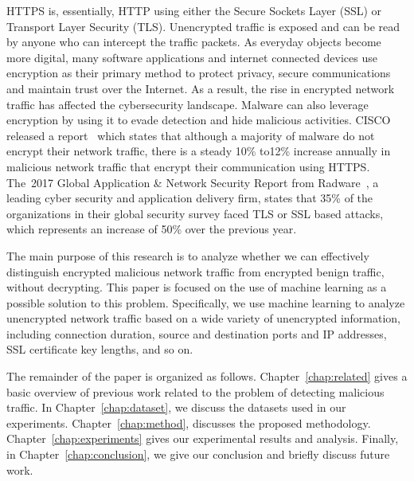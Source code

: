 HTTPS is, essentially, HTTP using either the Secure Sockets Layer (SSL) or Transport Layer Security (TLS). Unencrypted traffic is exposed and can be read by anyone who can intercept the traffic packets. As everyday objects become more digital, many software applications and internet connected devices use encryption as their primary method to protect privacy, secure communications and maintain trust over the Internet. As a result, the rise in encrypted network traffic has affected the cybersecurity landscape. Malware can also leverage encryption by using it to evade detection and hide malicious activities. CISCO released a report~\cite{Anderson16} which states that although a majority of malware do not encrypt their network traffic, there is a steady 10\% to12\% increase annually in malicious network traffic that encrypt their communication using HTTPS. The~2017 Global Application \& Network Security Report from Radware~\cite{Radware17}, a leading cyber security and application delivery firm, states that 35\% of the organizations in their global security survey faced TLS or SSL based attacks, which represents an increase of 50\% over the previous year.

The main purpose of this research is to analyze whether we can effectively distinguish encrypted malicious network traffic from encrypted benign traffic, without decrypting. This paper is focused on the use of machine learning as a possible solution to this problem. Specifically, we use machine learning to analyze unencrypted network traffic based on a wide variety of unencrypted information, including connection duration, source and destination ports and IP addresses, SSL certificate key lengths, and so on.

The remainder of the paper is organized as follows. Chapter~\ref{chap:related} gives a basic overview of previous work related to the problem of detecting malicious traffic. In Chapter~\ref{chap:dataset}, we discuss the datasets used in our experiments. Chapter~\ref{chap:method}, discusses the proposed methodology. Chapter~\ref{chap:experiments} gives our experimental results and analysis. Finally, in Chapter~\ref{chap:conclusion}, we give our conclusion and briefly discuss future work.
